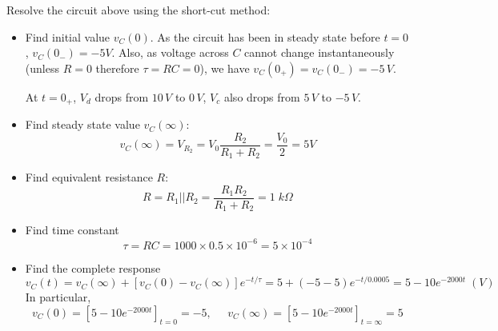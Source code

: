 \documentclass{article}
\begin{document}
Resolve the circuit above using the short-cut method:
\begin{itemize}
\item Find initial value $v_C(0)$. As the circuit has been in steady 
  state before $t=0$, $v_C(0_-)=-5V$. Also, as voltage across $C$ 
  cannot change instantaneously (unless $R=0$ therefore $\tau=RC=0$), 
  we have $v_C(0_+)=v_C(0_-)=-5\,V$.

  At $t=0_+$, $V_d$ drops from $10\,V$ to $0\,V$, $V_c$ also drops 
  from $5\,V$ to $-5\,V$.
  
\item Find steady state value $v_C(\infty)$:
  \begin{equation}
    v_C(\infty)=V_{R_2}=V_0\frac{R_2}{R_1+R_2}=\frac{V_0}{2}=5V	
  \end{equation}
\item Find equivalent resistance $R$:
  \begin{equation}
    R=R_1 || R_2=\frac{R_1 R_2}{R_1+R_2}=1\;k\Omega	
  \end{equation}
\item Find time constant 
  \begin{equation}
    \tau=RC=1000\times 0.5\times 10^{-6}=5\times 10^{-4}     
  \end{equation}
\item Find the complete response
  \begin{equation}
    v_C(t)=v_C(\infty)+[v_C(0)-v_C(\infty)]e^{-t/\tau}
    =5+(-5-5) e^{-t/0.0005}=5-10 e^{-2000t}\;(V)	
  \end{equation}
  In particular,
  \begin{equation}
    v_C(0)=\left[5-10 e^{-2000t}\right]_{t=0}=-5,\;\;\;\;\;
    v_C(\infty)=\left[5-10 e^{-2000t}\right]_{t=\infty}=5
  \end{equation}


\end{itemize}
\end{document}
